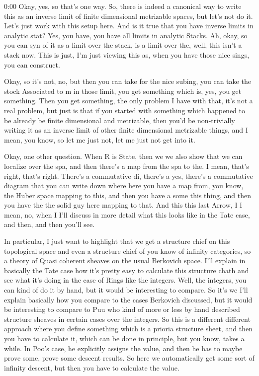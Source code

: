 \begin{unfinished}{0:00}
Okay, yes, so that's one way. So, there is indeed a canonical way to write this as an inverse limit of finite dimensional metrizable spaces, but let's not do it. Let's just work with this setup here. And is it true that you have inverse limits in analytic stat? Yes, you have, you have all limits in analytic Stacks. Ah, okay, so you can syn of it as a limit over the stack, is a limit over the, well, this isn't a stack now. This is just, I'm just viewing this as, when you have those nice sings, you can construct.

Okay, so it's not, no, but then you can take for the nice subing, you can take the stock Associated to m in those limit, you get something which is, yes, you get something. Then you get something, the only problem I have with that, it's not a real problem, but just is that if you started with something which happened to be already be finite dimensional and metrizable, then you'd be non-trivially writing it as an inverse limit of other finite dimensional metrizable things, and I mean, you know, so let me just not, let me just not get into it.

Okay, one other question. When R is State, then we we also show that we can localize over the spa, and then there's a map from the spa to the. I mean, that's right, that's right. There's a commutative di, there's a yes, there's a commutative diagram that you can write down where here you have a map from, you know, the Huber space mapping to this, and then you have a some this thing, and then you have the the solid guy here mapping to that. And this this last Arrow, I I mean, no, when I I'll discuss in more detail what this looks like in the Tate case, and then, and then you'll see.

In particular, I just want to highlight that we get a structure chief on this topological space and even a structure chief of you know of infinity categories, so a theory of Quasi coherent sheaves on the usual Berkovich space. I'll explain in basically the Tate case how it's pretty easy to calculate this structure chath and see what it's doing in the case of Rings like the integers. Well, the integers, you can kind of do it by hand, but it would be interesting to compare. So it's we I'll explain basically how you compare to the cases Berkovich discussed, but it would be interesting to compare to Puu who kind of more or less by hand described structure sheaves in certain cases over the integers. So this is a different different approach where you define something which is a prioria structure sheet, and then you have to calculate it, which can be done in principle, but you know, takes a while. In Poo's case, he explicitly assigns the value, and then he has to maybe prove some, prove some descent results. So here we automatically get some sort of infinity descent, but then you have to calculate the value.


\end{unfinished}
